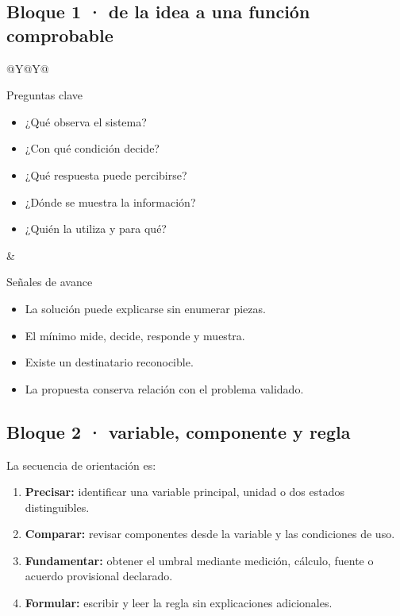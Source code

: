 \documentclass[10pt,a4paper]{article}
\begin{document}
\subsection{Bloque 1 · de la idea a una función comprobable}
\begin{tabularx}{\textwidth}{@{}Y@{\hspace{5mm}}Y@{}}
\begin{docbox}[height=63mm]{Preguntas clave}
\begin{itemize}
  \item ¿Qué observa el sistema?
  \item ¿Con qué condición decide?
  \item ¿Qué respuesta puede percibirse?
  \item ¿Dónde se muestra la información?
  \item ¿Quién la utiliza y para qué?
\end{itemize}
\end{docbox}
&
\begin{docbox}[height=63mm]{Señales de avance}
\begin{itemize}
  \item La solución puede explicarse sin enumerar piezas.
  \item El mínimo mide, decide, responde y muestra.
  \item Existe un destinatario reconocible.
  \item La propuesta conserva relación con el problema validado.
\end{itemize}
\end{docbox}
\end{tabularx}

\subsection{Bloque 2 · variable, componente y regla}
La secuencia de orientación es:
\begin{enumerate}
  \item \textbf{Precisar:} identificar una variable principal, unidad o dos estados distinguibles.
  \item \textbf{Comparar:} revisar componentes desde la variable y las condiciones de uso.
  \item \textbf{Fundamentar:} obtener el umbral mediante medición, cálculo, fuente o acuerdo provisional declarado.
  \item \textbf{Formular:} escribir y leer la regla sin explicaciones adicionales.
\end{enumerate}
\end{document}
